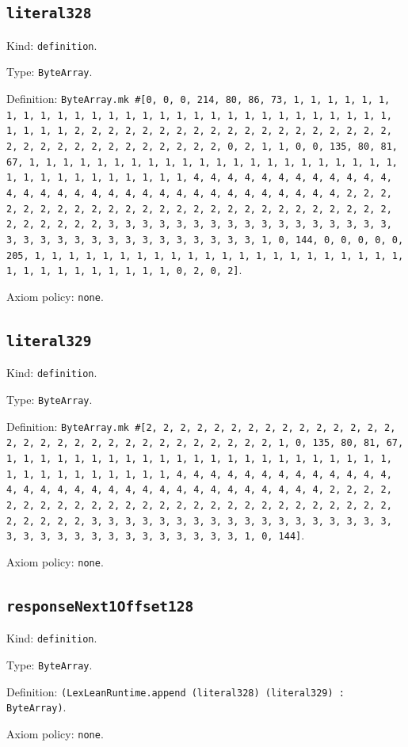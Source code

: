 \documentclass[11pt]{article}
\begin{document}
\subsection*{\texttt{literal328}}
\noindent Kind: \texttt{definition}.\par
\noindent Type: \texttt{ByteArray}.\par
\noindent Definition: \texttt{ByteArray.mk \#[0, 0, 0, 214, 80, 86, 73, 1, 1, 1, 1, 1, 1, 1, 1, 1, 1, 1, 1, 1, 1, 1, 1, 1, 1, 1, 1, 1, 1, 1, 1, 1, 1, 1, 1, 1, 1, 1, 1, 1, 2, 2, 2, 2, 2, 2, 2, 2, 2, 2, 2, 2, 2, 2, 2, 2, 2, 2, 2, 2, 2, 2, 2, 2, 2, 2, 2, 2, 2, 2, 2, 2, 0, 2, 1, 1, 0, 0, 135, 80, 81, 67, 1, 1, 1, 1, 1, 1, 1, 1, 1, 1, 1, 1, 1, 1, 1, 1, 1, 1, 1, 1, 1, 1, 1, 1, 1, 1, 1, 1, 1, 1, 1, 1, 1, 4, 4, 4, 4, 4, 4, 4, 4, 4, 4, 4, 4, 4, 4, 4, 4, 4, 4, 4, 4, 4, 4, 4, 4, 4, 4, 4, 4, 4, 4, 4, 4, 2, 2, 2, 2, 2, 2, 2, 2, 2, 2, 2, 2, 2, 2, 2, 2, 2, 2, 2, 2, 2, 2, 2, 2, 2, 2, 2, 2, 2, 2, 2, 2, 3, 3, 3, 3, 3, 3, 3, 3, 3, 3, 3, 3, 3, 3, 3, 3, 3, 3, 3, 3, 3, 3, 3, 3, 3, 3, 3, 3, 3, 3, 3, 3, 1, 0, 144, 0, 0, 0, 0, 0, 205, 1, 1, 1, 1, 1, 1, 1, 1, 1, 1, 1, 1, 1, 1, 1, 1, 1, 1, 1, 1, 1, 1, 1, 1, 1, 1, 1, 1, 1, 1, 1, 1, 0, 2, 0, 2]}.\par
\noindent Axiom policy: \texttt{none}.\par
\subsection*{\texttt{literal329}}
\noindent Kind: \texttt{definition}.\par
\noindent Type: \texttt{ByteArray}.\par
\noindent Definition: \texttt{ByteArray.mk \#[2, 2, 2, 2, 2, 2, 2, 2, 2, 2, 2, 2, 2, 2, 2, 2, 2, 2, 2, 2, 2, 2, 2, 2, 2, 2, 2, 2, 2, 2, 2, 1, 0, 135, 80, 81, 67, 1, 1, 1, 1, 1, 1, 1, 1, 1, 1, 1, 1, 1, 1, 1, 1, 1, 1, 1, 1, 1, 1, 1, 1, 1, 1, 1, 1, 1, 1, 1, 1, 1, 4, 4, 4, 4, 4, 4, 4, 4, 4, 4, 4, 4, 4, 4, 4, 4, 4, 4, 4, 4, 4, 4, 4, 4, 4, 4, 4, 4, 4, 4, 4, 4, 2, 2, 2, 2, 2, 2, 2, 2, 2, 2, 2, 2, 2, 2, 2, 2, 2, 2, 2, 2, 2, 2, 2, 2, 2, 2, 2, 2, 2, 2, 2, 2, 3, 3, 3, 3, 3, 3, 3, 3, 3, 3, 3, 3, 3, 3, 3, 3, 3, 3, 3, 3, 3, 3, 3, 3, 3, 3, 3, 3, 3, 3, 3, 3, 1, 0, 144]}.\par
\noindent Axiom policy: \texttt{none}.\par
\subsection*{\texttt{responseNext1Offset128}}
\noindent Kind: \texttt{definition}.\par
\noindent Type: \texttt{ByteArray}.\par
\noindent Definition: \texttt{(LexLeanRuntime.append (literal328) (literal329) : ByteArray)}.\par
\noindent Axiom policy: \texttt{none}.\par
\end{document}
